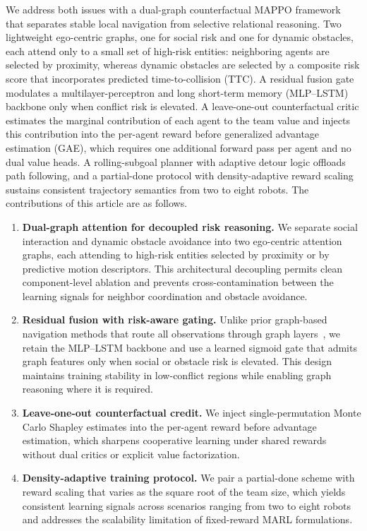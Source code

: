 \documentclass[journal,twoside,web]{ieeecolor}
\begin{document}
We address both issues with a dual-graph counterfactual MAPPO framework that separates stable local navigation from selective relational reasoning. Two lightweight ego-centric graphs, one for social risk and one for dynamic obstacles, each attend only to a small set of high-risk entities: neighboring agents are selected by proximity, whereas dynamic obstacles are selected by a composite risk score that incorporates predicted time-to-collision (TTC). A residual fusion gate modulates a multilayer-perceptron and long short-term memory (MLP--LSTM) backbone only when conflict risk is elevated. A leave-one-out counterfactual critic estimates the marginal contribution of each agent to the team value and injects this contribution into the per-agent reward before generalized advantage estimation (GAE), which requires one additional forward pass per agent and no dual value heads. A rolling-subgoal planner with adaptive detour logic offloads path following, and a partial-done protocol with density-adaptive reward scaling sustains consistent trajectory semantics from two to eight robots. The contributions of this article are as follows.
\begin{enumerate}
    \item \textbf{Dual-graph attention for decoupled risk reasoning.} We separate social interaction and dynamic obstacle avoidance into two ego-centric attention graphs, each attending to high-risk entities selected by proximity or by predictive motion descriptors. This architectural decoupling permits clean component-level ablation and prevents cross-contamination between the learning signals for neighbor coordination and obstacle avoidance.
    \item \textbf{Residual fusion with risk-aware gating.} Unlike prior graph-based navigation methods that route all observations through graph layers~\cite{zhang2025gatmapf,escudie2024multisoc}, we retain the MLP--LSTM backbone and use a learned sigmoid gate that admits graph features only when social or obstacle risk is elevated. This design maintains training stability in low-conflict regions while enabling graph reasoning where it is required.
    \item \textbf{Leave-one-out counterfactual credit.} We inject single-permutation Monte Carlo Shapley estimates into the per-agent reward before advantage estimation, which sharpens cooperative learning under shared rewards without dual critics or explicit value factorization.
    \item \textbf{Density-adaptive training protocol.} We pair a partial-done scheme with reward scaling that varies as the square root of the team size, which yields consistent learning signals across scenarios ranging from two to eight robots and addresses the scalability limitation of fixed-reward MARL formulations.
\end{enumerate}
\end{document}
